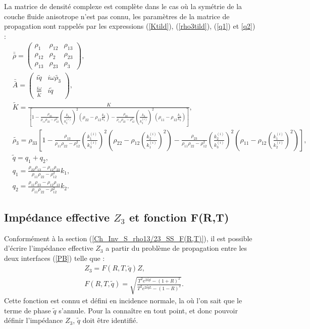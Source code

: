\documentclass[12pt]{report}
\begin{document}
    La matrice de densité complexe est complète dans le cas où la symétrie de la couche fluide anisotrope n'est pas connu, les paramètres de la matrice de propagation  sont rappelés par les expressions (\ref{Ktild}), (\ref{rho3tild}), (\ref{q1}) et \ref{q2}) :
     \begin{align*}
	 &\bar{\bar{\rho}}=\begin{pmatrix} \rho_1 & \rho_{12} & \rho_{13} \\ \rho_{12} & \rho_2 & \rho_{23} \\ \rho_{13} & \rho_{23} & \rho_3 \end{pmatrix},\\
     &\bar{\bar{A}}=\begin{pmatrix} i \tilde{q} & i \omega \tilde{\rho_3} \\ \frac{i \omega}{\tilde{K}} & i \tilde{q} \end{pmatrix},\\
	 &\tilde{K}=\frac{K}{[1-\frac{\rho_{33}}{\rho_{11}\rho_{22}-\rho_{12}^2}(\frac{k_1}{k_3^{(i)}})^2(\rho_{22}-\rho_{12}\frac{k_2}{k_1})-\frac{\rho_{33}}{\rho_{11}\rho_{22}-\rho_{12}^2}(\frac{k_2}{k_3^{(i)}})^2(\rho_{11}-\rho_{12}\frac{k_1}{k_2})]},\\
     &\tilde{\rho_3}=\rho_{33}[1-\frac{\rho_{13}}{\rho_{11}\rho_{22}-\rho_{12}^2}(\frac{k_1^{(i)}}{k_3^{(i)}})^2(\rho_{22}-\rho_{12}(\frac{k_2^{(i)}}{k_1^{(i)}})^2)-\frac{\rho_{23}}{\rho_{11}\rho_{22}-\rho_{12}^2}(\frac{k_2^{(i)}}{k_3^{(i)}})^2(\rho_{11}-\rho_{12}(\frac{k_1^{(i)}}{k_2^{(i)}})^2)], \\
     &\tilde{q}=q_1+q_2,\\
	 &q_{1}=\frac{\rho_{22}\rho_{13}-\rho_{12}\rho_{23}}{\rho_{11}\rho_{22}-\rho_{12}^2}k_1,\\
     &q_{2}= \frac{\rho_{11}\rho_{23}-\rho_{12}\rho_{13}}{\rho_{11}\rho_{22}-\rho_{12}^2}k_2.
          \end{align*}
          
\subsection{Impédance effective $Z_3$ et fonction F(R,T)}
	Conformément à la section (\ref{Ch_Inv_S_rho13/23_SS_F(R,T)}), il est possible d'écrire l'impédance effective $Z_3$ a partir du problème de propagation entre les deux interfaces (\ref{PB}) telle que :
    \begin{align*}
    &Z_3=F(R,T,\tilde{q})Z,\nonumber\\
    &F(R,T,\tilde{q})=\sqrt{\frac{T^2e^{2i\tilde{q}l}-(1+R)^2}{T^2e^{2i\tilde{q}L}-(1-R)^2}}.
    \end{align*}
    Cette fonction est connu et défini en incidence normale, la où l'on sait que le terme de phase $\tilde{q}$ s'annule. Pour la connaître en tout point, et donc pouvoir définir l'impédance $Z_3$, $\tilde{q}$ doit être identifié. 
    
\end{document}
